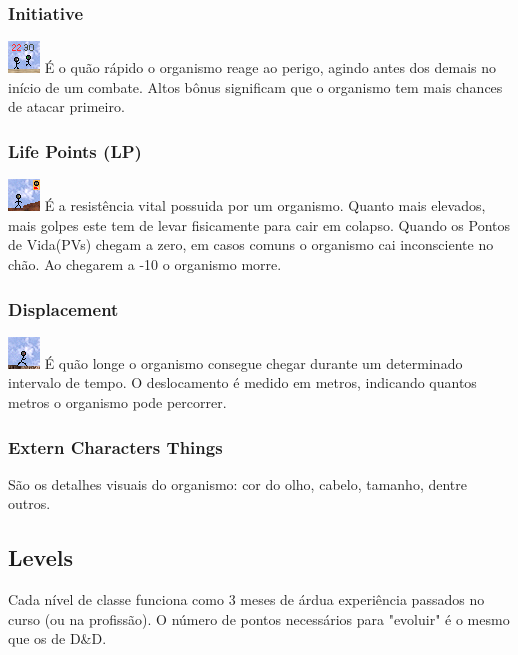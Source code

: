 \documentclass[ letterpaper,12pt]{article}
\begin{document}
\subsubsection{Initiative}
\includegraphics{../data/skills/Img/iniciativa.png}
É o quão rápido o organismo reage ao perigo, agindo antes dos demais no início de um combate. Altos bônus significam que o organismo tem mais chances de atacar primeiro.

\subsubsection{Life Points (LP)}
\includegraphics{../data/skills/Img/pv.png}
É a resistência vital possuida por um organismo. Quanto mais elevados, mais golpes este tem de levar fisicamente para cair em colapso. Quando os Pontos de Vida(PVs) chegam a zero, em casos comuns o organismo cai inconsciente no chão. Ao chegarem a -10 o organismo morre.

\subsubsection{Displacement}
\includegraphics{../data/skills/Img/deslocamento.png}
É quão longe o organismo consegue chegar durante um determinado intervalo de tempo. O deslocamento é medido em metros, indicando quantos metros o organismo pode percorrer.

\subsubsection{Extern Characters Things}
 São os detalhes visuais do organismo: cor do olho, cabelo, tamanho, dentre outros.

\subsection{Levels}
Cada nível de classe funciona como 3 meses de árdua experiência passados no curso (ou na profissão). O número de pontos necessários para "evoluir" é o mesmo que os de D\&D.
\end{document}
